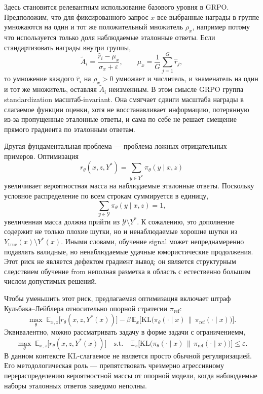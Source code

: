 Здесь становится релевантным использование базового уровня в GRPO. Предположим, что для фиксированного запрос \(x\) все выбранные награды в группе умножаются на один и тот же положительный множитель \(\rho_x\), например потому что используется только доля наблюдаемые эталонные ответы. Если стандартизовать награды внутри группы,
\[
 \widetilde A_i
 =
 \frac{\hat r_i - \mu_x}{\sigma_x+\varepsilon},
 \qquad
 \mu_x=\frac{1}{G}\sum_{j=1}^{G}\hat r_j,
\]
то умножение каждого \(\hat r_i\) на \(\rho_x>0\) умножает и числитель, и знаменатель на один и тот же множитель, оставляя \(\widetilde A_i\) неизменным. В этом смысле GRPO группа standardization масштаб-invariant. Она смягчает сдвиги масштаба награды в слагаемое функции оценки, хотя не восстанавливает информацию, потерянную из-за пропущенные эталонные ответы, и сама по себе не решает смещение прямого градиента по эталонным ответам.

Другая фундаментальная проблема --- проблема ложных отрицательных примеров. Оптимизация
\[
 r_{\theta}(x,z,Y^{*})=\sum_{y\in Y^{*}}\pi_{\theta}(y\mid x,z)
\]
увеличивает вероятностная масса на наблюдаемые эталонные ответы. Поскольку условное распределение по всем строкам суммируется в единицу,
\[
 \sum_{y\in\mathcal{Y}}\pi_{\theta}(y\mid x,z)=1,
\]
увеличенная масса должна прийти из \(\mathcal{Y}\setminus Y^{*}\). К сожалению, это дополнение содержит не только плохие шутки, но и ненаблюдаемые хорошие шутки из \(Y_{\mathrm{true}}(x)\setminus Y^{*}(x)\). Иными словами, обучение signal может непреднамеренно подавлять валидные, но ненаблюдаемые удачные юмористические продолжения. Этот риск не является дефектом градиент вывод; он является структурным следствием обучение from неполная разметка в область с естественно большим числом допустимых решений.

Чтобы уменьшить этот риск, предлагаемая оптимизация включает штраф Кульбака--Лейблера относительно опорной стратегии \(\pi_{\mathrm{ref}}\):
\[
 \max_{\theta}
 \;
 \mathbb{E}_{x,z}\big[r_{\theta}(x,z,Y^{*}(x))\big]
 -
 \beta\,
 \mathbb{E}_{x}\Big[
 \mathrm{KL}\big(
 \pi_{\theta}(\cdot\mid x)\,\|\,\pi_{\mathrm{ref}}(\cdot\mid x)
 \big)
 \Big].
\]
Эквивалентно, можно рассматривать задачу в форме задачи с ограничениемм,
\[
 \max_{\theta}\;
 \mathbb{E}_{x,z}\big[r_{\theta}(x,z,Y^{*}(x))\big]
 \quad
 \text{s.t.}
 \quad
 \mathbb{E}_{x}
 \Big[
 \mathrm{KL}\big(
 \pi_{\theta}(\cdot\mid x)\,\|\,\pi_{\mathrm{ref}}(\cdot\mid x)
 \big)
 \Big]
 \le \varepsilon.
\]
В данном контексте KL-слагаемое не является просто обычной регуляризацией. Его методологическая роль --- препятствовать чрезмерно агрессивному перераспределению вероятностной массы от опорной модели, когда наблюдаемые наборы эталонных ответов заведомо неполны.


